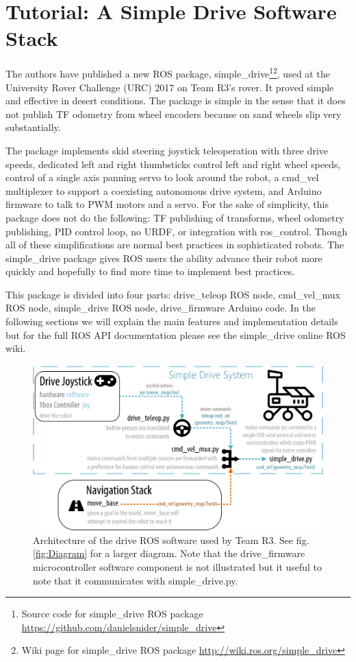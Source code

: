 \documentclass[runningheads,a4paper]{llncs}
\begin{document}
\section{Tutorial: A Simple Drive Software Stack}\label{drive}

The authors have published a new ROS package, simple\_drive\footnote{Source code for simple\_drive ROS package \url{https://github.com/danielsnider/simple_drive}}\footnote{Wiki page for simple\_drive ROS package \url{http://wiki.ros.org/simple_drive}}, used at the University Rover Challenge (URC) 2017 on Team R3's rover. It proved simple and effective in desert conditions. The package is simple in the sense that it does not publish TF odometry from wheel encoders because on sand wheels slip very substantially.

The package implements skid steering joystick teleoperation with three drive speeds, dedicated left and right thumbsticks control left and right wheel speeds, control of a single axis panning servo to look around the robot, a cmd\_vel multiplexer to support a coexisting autonomous drive system, and Arduino firmware to talk to PWM motors and a servo. For the sake of simplicity, this package does not do the following: TF publishing of transforms, wheel odometry publishing, PID control loop, no URDF, or integration with ros\_control. Though all of these simplifications are normal best practices in sophisticated robots. The simple\_drive package gives ROS users the ability advance their robot more quickly and hopefully to find more time to implement best practices.

This package is divided into four parts: drive\_teleop ROS node, cmd\_vel\_mux ROS node, simple\_drive ROS node, drive\_firmware Arduino code. In the following sections we will explain the main features and implementation details but for the full ROS API documentation please see the simple\_drive online ROS wiki.

\begin{figure}
\centering
\includegraphics[width=\textwidth]{Simple_Drive_Diagram}
\caption{Architecture of the drive ROS software used by Team R3. See fig. \ref{fig:Diagram} for a larger diagram. Note that the drive\_firmware microcontroller software component is not illustrated but it useful to note that it communicates with simple\_drive.py.}
\label{fig:Simple_Drive_Diagram}
\end{figure}
\end{document}
